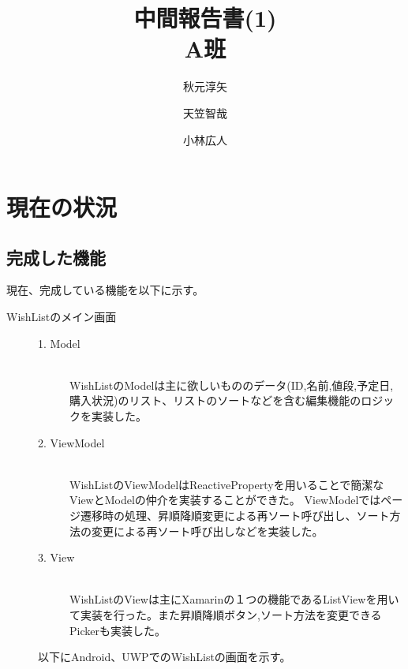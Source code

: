 ﻿\documentclass[a4j]{jarticle}
\title{中間報告書(1) \\ A班}
\author{秋元淳矢 \and 天笠智哉 \and 小林広人}
\date{}
\begin{document}
\maketitle

\section{現在の状況}
\subsection{完成した機能}
現在、完成している機能を以下に示す。
\begin{description}
	\item[WishListのメイン画面] \mbox{}
		\begin{description}
			\item[1. Model] \mbox{} \\
				WishListのModelは主に欲しいもののデータ(ID,名前,値段,予定日,購入状況)のリスト、リストのソートなどを含む編集機能のロジックを実装した。
			\item[2. ViewModel] \mbox{} \\
				WishListのViewModelはReactivePropertyを用いることで簡潔なViewとModelの仲介を実装することができた。
				ViewModelではページ遷移時の処理、昇順降順変更による再ソート呼び出し、ソート方法の変更による再ソート呼び出しなどを実装した。
			\item[3. View] \mbox{} \\
				WishListのViewは主にXamarinの１つの機能であるListViewを用いて実装を行った。また昇順降順ボタン,ソート方法を変更できるPickerも実装した。
		\end{description}
		以下にAndroid、UWPでのWishListの画面を示す。
		\begin{figure}[htbp]
			\centering

\end{figure}
\end{description}
\end{document}
